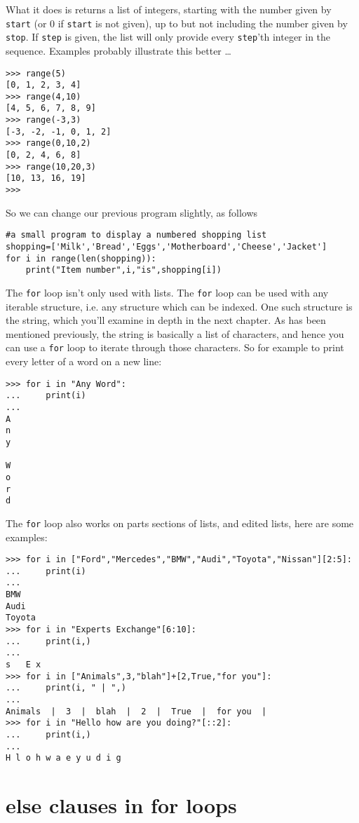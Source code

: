 What it does is returns a list of integers, starting with the number   given by \texttt{start} (or 0 if \texttt{start} is not given), up to but not including   the number given by \texttt{stop}. If \texttt{step} is given, the list will only   provide every \texttt{step}'th integer in the sequence. Examples probably   illustrate this better \ldots

\begin{lstlisting}
>>> range(5)
[0, 1, 2, 3, 4]
>>> range(4,10)
[4, 5, 6, 7, 8, 9]
>>> range(-3,3)
[-3, -2, -1, 0, 1, 2]
>>> range(0,10,2)
[0, 2, 4, 6, 8]
>>> range(10,20,3)
[10, 13, 16, 19]
>>>
\end{lstlisting}

So we can change our previous program slightly, as follows
\begin{lstlisting}
#a small program to display a numbered shopping list
shopping=['Milk','Bread','Eggs','Motherboard','Cheese','Jacket']
for i in range(len(shopping)):
    print("Item number",i,"is",shopping[i])
\end{lstlisting}

The \texttt{for} loop isn't only used with lists. The \texttt{for} loop can be used with any iterable structure, i.e. any structure which can be indexed. One such structure is the string, which you'll examine in depth in the next chapter. As has been mentioned previously, the string is basically a list of characters, and hence you can use a \texttt{for} loop to iterate through those characters. So for example to print every letter of a word on a new line:   
\begin{lstlisting}
>>> for i in "Any Word":
...     print(i)
... 
A
n
y
 
W
o
r
d
\end{lstlisting}

 The \texttt{for} loop also works on parts sections of lists, and edited lists, here are some examples:
\begin{lstlisting}
>>> for i in ["Ford","Mercedes","BMW","Audi","Toyota","Nissan"][2:5]:
...     print(i)
... 
BMW
Audi
Toyota
>>> for i in "Experts Exchange"[6:10]:
...     print(i,)
... 
s   E x
>>> for i in ["Animals",3,"blah"]+[2,True,"for you"]:
...     print(i, " | ",)
... 
Animals  |  3  |  blah  |  2  |  True  |  for you  | 
>>> for i in "Hello how are you doing?"[::2]:
...     print(i,)
... 
H l o h w a e y u d i g
\end{lstlisting}

\section{else clauses in for loops}

